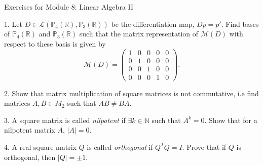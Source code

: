 \documentclass{article}
\theoremstyle{remark} %
\newcommand{\R}{{\mathbb{R}}}
\newcommand{\N}{{\mathbb{N}}}
\begin{document}
\begin{center}
\Large{Exercises for Module 8: Linear Algebra II}
\end{center}


1. Let $D \in \mathcal{L}(\mathbb{P}_4(\R),\mathbb{P}_3(\R))$ be the differentiation map, $Dp = p'$. Find bases of $\mathbb{P}_4(\R)$ and $\mathbb{P}_3(\R)$ such that the matrix representation of $\mathcal{M}(D)$ with respect to these basis is given by 
    \begin{equation*}
    \mathcal{M}(D) = \begin{pmatrix}
    1 & 0 & 0 & 0 & 0 \\
    0 & 1 & 0 & 0 & 0 \\
    0 & 0 & 1 & 0 & 0 \\
    0 & 0 & 0 & 1 & 0
     \end{pmatrix}.
    \end{equation*}

\vspace{11cm} %




2. Show that matrix multiplication of square matrices is not commutative, i.e find matrices $A,B \in M_{2}$ such that $AB\neq BA$.
\vspace{11cm} %




3.  A square matrix is called \emph{nilpotent} if $\exists k \in \N$ such that $A^k = 0$. Show that for a nilpotent matrix $A$, $|A| = 0$.

\vspace{7cm} %




4. A real square matrix $Q$ is called \emph{orthogonal} if $Q^T Q = I$. Prove that if $Q$ is orthogonal, then $|Q| = \pm 1$.

\vspace{7cm} %

\end{document}
